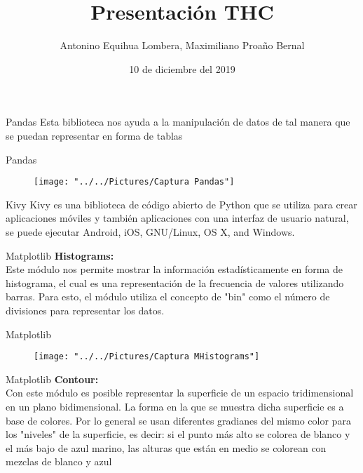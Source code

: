 \documentclass{beamer}
\title{Presentación THC}
\author{Antonino Equihua Lombera, Maximiliano Proaño Bernal}
\date{10 de diciembre del 2019}
\institute{Facultad de Ciencias, UNAM}
\begin{document}
\begin{frame}[plain]
    \maketitle
\end{frame}
\begin{frame}{Pandas}
	Esta biblioteca nos ayuda a la manipulación de datos de tal manera que se puedan representar en forma de tablas
\end{frame}

\begin{frame}{Pandas}
	
\begin{figure}
	\centering
	\texttt{[image: "../../Pictures/Captura Pandas"]}
	\caption{}
	\label{fig:captura-pandas}
\end{figure}

\end{frame}

\begin{frame}{Kivy}
	Kivy es una biblioteca de código abierto de Python que se utiliza para crear aplicaciones móviles y también aplicaciones con una interfaz de usuario natural, se puede ejecutar Android, iOS, GNU/Linux, OS X, and Windows.
	
\end{frame}

\begin{frame}{Matplotlib}
	\textbf{Histograms:}\\ Este módulo nos permite mostrar la información estadísticamente en forma de histograma, el cual es una representación de la frecuencia de valores utilizando barras. Para esto, el módulo utiliza el concepto de "bin" como el número de divisiones para representar los datos.
\end{frame}

\begin{frame}{Matplotlib}
	
\begin{figure}
	\centering
	\texttt{[image: "../../Pictures/Captura MHistograms"]}
	\caption{}
	\label{fig:captura-mhistograms}
\end{figure}

\end{frame}

\begin{frame}{Matplotlib}
	\textbf{Contour:}\\ Con este módulo es posible representar la superficie de un espacio tridimensional en un plano bidimensional. La forma en la que se muestra dicha superficie es a base de colores. Por lo general se usan diferentes gradianes del mismo color para los "niveles" de la superficie, es decir: si el punto más alto se colorea de blanco y el más bajo de azul marino, las alturas que están en medio se colorean con mezclas de blanco y azul
\end{frame}
\end{document}
